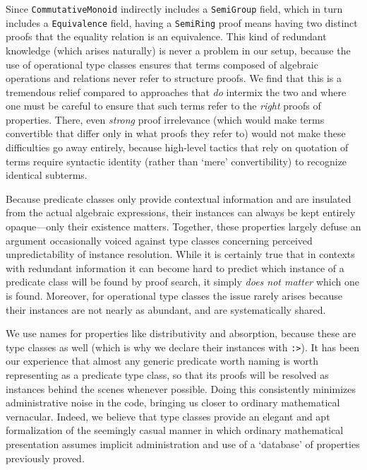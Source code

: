 \documentclass[a4paper,10pt,runningheads]{llncs}
\begin{document}
Since \lstinline|CommutativeMonoid| indirectly includes a \lstinline|SemiGroup| field, which in turn includes a \lstinline|Equivalence| field, having a \lstinline|SemiRing| proof means having two distinct proofs that the equality relation is an equivalence. This kind of redundant knowledge (which arises naturally) is never a problem in our setup, because the use of operational type classes ensures that terms composed of algebraic operations and relations never refer to structure proofs. We find that this is a tremendous relief compared to approaches that \emph{do} intermix the two and where one must be careful to ensure that such terms refer to the \emph{right} proofs of properties. There, even \emph{strong} proof irrelevance (which would make terms convertible that differ only in what proofs they refer to) would not make these difficulties go away entirely, because high-level tactics that rely on quotation of terms require syntactic identity (rather than `mere' convertibility) to recognize identical subterms.

Because predicate classes only provide contextual information and are insulated from the actual algebraic expressions, their instances can always be kept entirely opaque---only their existence matters. Together, these properties largely defuse an argument occasionally voiced against type classes concerning perceived unpredictability of instance resolution. While it is certainly true that in contexts with redundant information it can become hard to predict which instance of a predicate class will be found by proof search, it simply \emph{does not matter} which one is found. Moreover, for operational type classes the issue rarely arises because their instances are not nearly as abundant, and are systematically shared.

We use names for properties like distributivity and absorption, because these are type classes as well (which is why we declare their instances with \lstinline|:>|). It has been our experience that almost any generic predicate worth naming is worth representing as a predicate type class, so that its proofs will be resolved as instances behind the scenes whenever possible. Doing this consistently minimizes administrative noise in the code, bringing us closer to ordinary mathematical vernacular. Indeed, we believe that type classes provide an elegant and apt formalization of the seemingly casual manner in which ordinary mathematical presentation assumes implicit administration and use of a `database' of properties previously proved.
\end{document}
